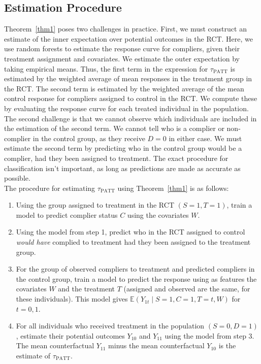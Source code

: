 \documentclass[12pt]{article}
\newcommand{\ex}{\mathbb{E}} %
\begin{document}
\subsection{Estimation Procedure}
Theorem~\ref{thm1} poses two challenges in practice.  First, we must construct an estimate of the inner expectation over potential outcomes in the RCT.  Here, we use random forests to estimate the response curve for compliers, given their treatment assignment and covariates. We estimate the outer expectation by taking empirical means.  Thus, the first term in the expression for $\tau_{\text{PATT}}$ is estimated by the weighted average of mean responses in the treatment group in the RCT. The second term is estimated by the weighted average of the mean control response for compliers assigned to control in the RCT.  We compute these by evaluating the response curve for each treated individual in the population.  \\

The second challenge is that we cannot observe which individuals are included in the estimation of the second term. We cannot tell who is a complier or non-complier in the control group, as they receive $D=0$ in either case.  We must estimate the second term by predicting who in the control group would be a complier, had they been assigned to treatment.  The exact procedure for classification isn't important, as long as predictions are made as accurate as possible. \\

The procedure for estimating $\tau_{\text{PATT}}$ using Theorem~\ref{thm1} is as follows:
\begin{enumerate}
\item Using the group assigned to treatment in the RCT $(S=1, T=1)$, train a model to predict complier status $C$ using the covariates $W$.
\item Using the model from step 1, predict who in the RCT assigned to control \textit{would have} complied to treatment had they been assigned to the treatment group.
\item For the group of observed compliers to treatment and predicted compliers in the control group, train a model to predict the response using as features the covariates $W$ and the treatment $T$ (assigned and observed are the same, for these individuals).  This model gives $\ex(Y_{1t} \mid S=1, C=1, T=t, W)$ for $t = 0,1$.
\item For all individuals who received treatment in the population $(S=0, D=1)$, estimate their potential outcomes $Y_{10}$ and $Y_{11}$ using the model from step 3.  The mean counterfactual $Y_{11}$ minus the mean counterfactual $Y_{10}$ is the estimate of $\tau_{\text{PATT}}$.
\end{enumerate}
\end{document}

